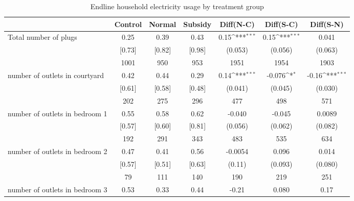\begin{table}[htbp]\centering
\def\sym#1{\ifmmode^{#1}\else\(^{#1}\)\fi}
\caption{Endline household electricity usage by treatment group \label{tab:"balance"}}
\begin{tabular*}{1\hsize}{@{\hskip\tabcolsep\extracolsep\fill}l*{1}{cccccc}}
\toprule
                                &  Control&   Normal&  Subsidy&Diff(N-C)         &Diff(S-C)         &Diff(S-N)         \\
\midrule
Total number of plugs           &     0.25&     0.39&     0.43&     0.15\sym{***}&     0.15\sym{***}&    0.041         \\
                                &   [0.73]&   [0.82]&   [0.98]&  (0.053)         &  (0.056)         &  (0.063)         \\
                                &     1001&      950&      953&     1951         &     1954         &     1903         \\
number of outlets in courtyard  &     0.42&     0.44&     0.29&     0.14\sym{***}&   -0.076\sym{*}  &    -0.16\sym{***}\\
                                &   [0.61]&   [0.58]&   [0.48]&  (0.041)         &  (0.045)         &  (0.030)         \\
                                &      202&      275&      296&      477         &      498         &      571         \\
number of outlets in bedroom 1  &     0.55&     0.58&     0.62&   -0.040         &   -0.045         &   0.0089         \\
                                &   [0.57]&   [0.60]&   [0.81]&  (0.056)         &  (0.062)         &  (0.082)         \\
                                &      192&      291&      343&      483         &      535         &      634         \\
number of outlets in bedroom 2  &     0.47&     0.41&     0.56&  -0.0054         &    0.096         &    0.014         \\
                                &   [0.57]&   [0.51]&   [0.63]&   (0.11)         &  (0.093)         &  (0.080)         \\
                                &       79&      111&      140&      190         &      219         &      251         \\
number of outlets in bedroom 3  &     0.53&     0.33&     0.44&    -0.21         &    0.080         &     0.17         \\

\end{tabular*}
\end{table}
